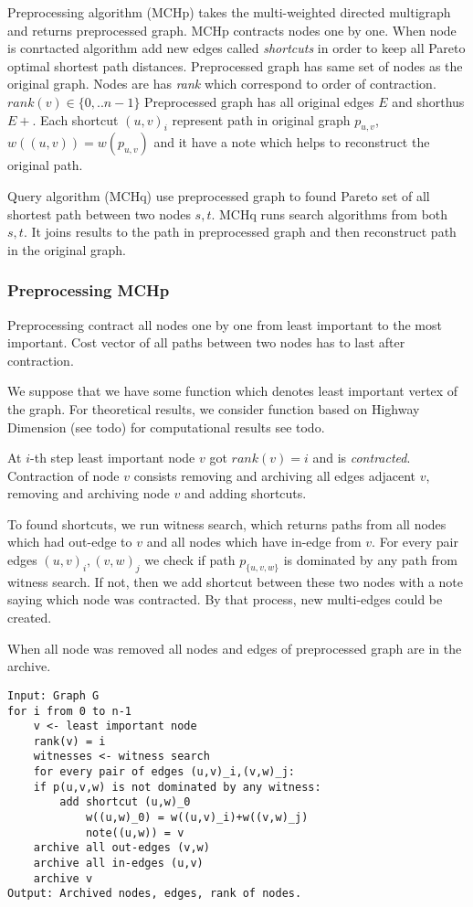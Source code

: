 Preprocessing algorithm (MCHp) takes the multi-weighted directed multigraph
and returns preprocessed graph. MCHp contracts nodes one by one. 
When node is conrtacted algorithm add new edges called \emph{shortcuts} in order
to keep all Pareto optimal shortest path distances. 
Preprocessed graph has same set of nodes as the original graph.
Nodes are has \emph{rank} which correspond to order of contraction.
$rank(v) \in \{0,..n-1\}$
Preprocessed graph has all original edges $E$ and shorthus $E+$.
Each shortcut $(u,v)_i$ represent 
path in original graph $p_{u,v}$, $w((u,v)) = w(p_{u,v})$ and it have a note which helps
to reconstruct the original path.

Query algorithm (MCHq) use preprocessed graph to found Pareto set of all
shortest path between two nodes $s, t$. MCHq runs search algorithms
from both $s, t$. 
It joins results to the path in preprocessed graph 
and then reconstruct path in the original graph.

\subsubsection{Preprocessing MCHp}

Preprocessing contract all nodes one by one from least important to the most important. 
Cost vector of all paths between two nodes has to last after contraction.

We suppose that we have some function which denotes least important vertex of the graph. For theoretical results, we consider function based on Highway Dimension
(see todo)  for computational results see todo.

At $i$-th step least important node $v$ got $rank(v) = i$ and is \emph{contracted}. 
Contraction of node $v$ consists removing and archiving all edges adjacent $v$, removing 
and archiving node $v$ and adding shortcuts. 

To found shortcuts, we run witness search, which returns paths from all nodes which had
out-edge to $v$ and all nodes which have in-edge from $v$. 
For every pair edges $(u,v)_i,(v,w)_j$ we check 
if path $p_{\{u,v,w\}}$ is dominated by any path from witness search. 
If not, then we add shortcut between these two nodes with a note 
saying which node was contracted.
By that process, new multi-edges could be created.

When all node was removed all nodes and edges of preprocessed graph are in the archive.

\begin{lstlisting}[caption={MCHp},label=list:8-6,captionpos=t,float,abovecaptionskip=-\medskipamount]
Input: Graph G
for i from 0 to n-1
    v <- least important node
    rank(v) = i
    witnesses <- witness search
    for every pair of edges (u,v)_i,(v,w)_j:
    if p(u,v,w) is not dominated by any witness:
        add shortcut (u,w)_0
            w((u,w)_0) = w((u,v)_i)+w((v,w)_j)
            note((u,w)) = v
    archive all out-edges (v,w) 
    archive all in-edges (u,v)
    archive v
Output: Archived nodes, edges, rank of nodes.
\end{lstlisting}


